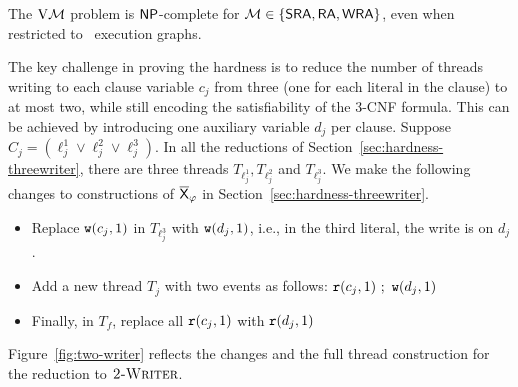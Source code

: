 \begin{theorem}
\label{thm:two-writer-hardness}
    The $\mathrm{V}\mathcal{M}$ problem is $\mathsf{NP}$-complete for $\mathcal{M} \in \{\mathsf{SRA}, \mathsf{RA}, \mathsf{WRA}\}$, even when restricted to \twowriter\ execution graphs.
\end{theorem}



The key challenge in proving the hardness is to reduce the number of threads writing to each clause variable $c_j$ from three (one for each literal in the clause) to at most two, while still encoding the satisfiability of the 3-CNF formula. This can be achieved by introducing one auxiliary variable $d_j$ per clause. Suppose $C_j = (\ell_j^1 \vee \ell_j^2 \vee \ell_j^3)$. In all the reductions of Section~\ref{sec:hardness-threewriter}, there are three threads $T_{\ell_j^1}, T_{\ell_j^2}$ and $T_{\ell_j^3}$. We make the following changes to constructions of $\overline{\mathsf{\color{black}X}}_\varphi$ in Section~\ref{sec:hardness-threewriter}.

\begin{itemize}[leftmargin=0.1em]
\item Replace $\mathtt{w}(c_j, 1)$ in $T_{\ell_j^3}$ with $\mathtt{w}(d_j, 1)$, i.e., in the third literal, the write is on $d_j$.
\item Add a new thread $T_{j}$ with two events as follows: $\mathtt{r}(c_j, 1)~;~\mathtt{w}(d_j, 1)$
\item Finally, in $T_f$, replace all $\mathtt{r}(c_j, 1)$ with $\mathtt{r}(d_j, 1)$
\end{itemize}
Figure~\ref{fig:two-writer} reflects the changes and the full thread construction for the reduction to $\textsc{2-Writer}$.


